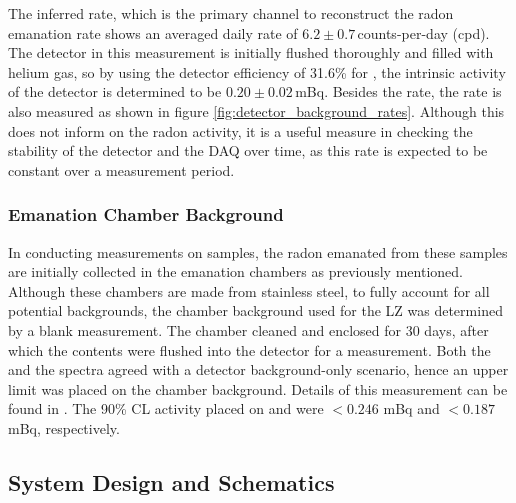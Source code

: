 The inferred \PoTOF{} rate, which is the primary channel to reconstruct the radon emanation rate shows an averaged daily rate of $6.2\pm{}0.7$\,counts-per-day (cpd). The detector in this measurement is initially flushed thoroughly and filled with helium gas, so by using the detector efficiency of 31.6\% for \PoTOF{}, the intrinsic activity of the detector is determined to be $0.20\pm0.02$\,mBq. Besides the \PoTOF{} rate, the \PoTOZ{} rate is also measured as shown in figure \ref{fig:detector_background_rates}. Although this does not inform on the radon activity, it is a useful measure in checking the stability of the detector and the DAQ over time, as this rate is expected to be constant over a measurement period. 

\subsubsection{Emanation Chamber Background}

In conducting measurements on samples, the radon emanated from these samples are initially collected in the emanation chambers as previously mentioned. Although these chambers are made from stainless steel, to fully account for all potential backgrounds, the chamber background used for the LZ was determined by a blank measurement. The chamber cleaned and enclosed for 30 days, after which the contents were flushed into the detector for a measurement. Both the \PoTOE{} and the \PoTOF{} spectra agreed with a detector background-only scenario, hence an upper limit was placed on the chamber background. Details of this measurement can be found in \cite{xin_2017}. The 90\% CL activity placed on \PoTOE{} and \PoTOF{} were $< 0.246$ mBq and $< 0.187$ mBq, respectively.


\subsection{System Design and Schematics}
\label{secsec:system_design_schematics}

